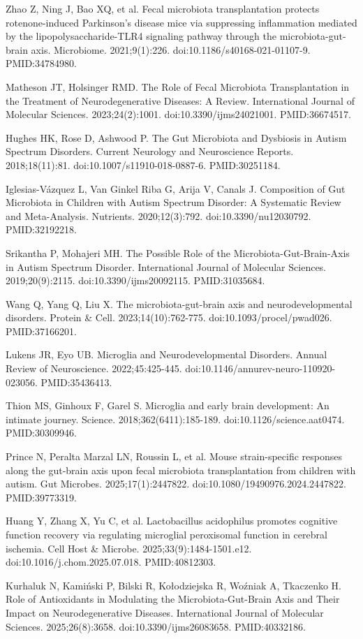 \documentclass[11pt,oneside]{book}
\newcommand{\refend}{\endgroup\par}
\newcommand{\reff}[2]{\par\hangindent=7mm\hangafter=1\noindent[#1]\hspace{2mm}#2\par}
\begin{document}
\reff{70}{Zhao Z, Ning J, Bao XQ, et al. Fecal microbiota transplantation protects rotenone-induced Parkinson's disease mice via suppressing inflammation mediated by the lipopolysaccharide-TLR4 signaling pathway through the microbiota-gut-brain axis. Microbiome. 2021;9(1):226. doi:10.1186/s40168-021-01107-9. PMID:34784980.}
\reff{71}{Matheson JT, Holsinger RMD. The Role of Fecal Microbiota Transplantation in the Treatment of Neurodegenerative Diseases: A Review. International Journal of Molecular Sciences. 2023;24(2):1001. doi:10.3390/ijms24021001. PMID:36674517.}
\reff{72}{Hughes HK, Rose D, Ashwood P. The Gut Microbiota and Dysbiosis in Autism Spectrum Disorders. Current Neurology and Neuroscience Reports. 2018;18(11):81. doi:10.1007/s11910-018-0887-6. PMID:30251184.}
\reff{73}{Iglesias-Vázquez L, Van Ginkel Riba G, Arija V, Canals J. Composition of Gut Microbiota in Children with Autism Spectrum Disorder: A Systematic Review and Meta-Analysis. Nutrients. 2020;12(3):792. doi:10.3390/nu12030792. PMID:32192218.}
\reff{74}{Srikantha P, Mohajeri MH. The Possible Role of the Microbiota-Gut-Brain-Axis in Autism Spectrum Disorder. International Journal of Molecular Sciences. 2019;20(9):2115. doi:10.3390/ijms20092115. PMID:31035684.}
\reff{75}{Wang Q, Yang Q, Liu X. The microbiota-gut-brain axis and neurodevelopmental disorders. Protein \& Cell. 2023;14(10):762-775. doi:10.1093/procel/pwad026. PMID:37166201.}
\reff{76}{Lukens JR, Eyo UB. Microglia and Neurodevelopmental Disorders. Annual Review of Neuroscience. 2022;45:425-445. doi:10.1146/annurev-neuro-110920-023056. PMID:35436413.}
\reff{77}{Thion MS, Ginhoux F, Garel S. Microglia and early brain development: An intimate journey. Science. 2018;362(6411):185-189. doi:10.1126/science.aat0474. PMID:30309946.}
\reff{78}{Prince N, Peralta Marzal LN, Roussin L, et al. Mouse strain-specific responses along the gut-brain axis upon fecal microbiota transplantation from children with autism. Gut Microbes. 2025;17(1):2447822. doi:10.1080/19490976.2024.2447822. PMID:39773319.}
\reff{79}{Huang Y, Zhang X, Yu C, et al. Lactobacillus acidophilus promotes cognitive function recovery via regulating microglial peroxisomal function in cerebral ischemia. Cell Host \& Microbe. 2025;33(9):1484-1501.e12. doi:10.1016/j.chom.2025.07.018. PMID:40812303.}
\reff{80}{Kurhaluk N, Kamiński P, Bilski R, Kołodziejska R, Woźniak A, Tkaczenko H. Role of Antioxidants in Modulating the Microbiota-Gut-Brain Axis and Their Impact on Neurodegenerative Diseases. International Journal of Molecular Sciences. 2025;26(8):3658. doi:10.3390/ijms26083658. PMID:40332186.}
\refend
\end{document}
